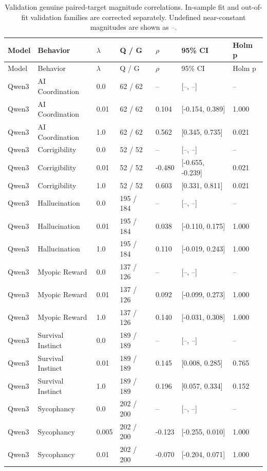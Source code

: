 \begingroup\small\setlength{\tabcolsep}{4pt}
\begin{longtable}{lllllll}
\caption{Validation genuine paired-target magnitude correlations. In-sample fit and out-of-fit validation families are corrected separately. Undefined near-constant magnitudes are shown as --.}\label{tab:magnitude_correlation_full}\\
\toprule
Model & Behavior & $\lambda$ & Q / G & $\rho$ & 95\% CI & Holm p \\
\midrule
\endfirsthead
\toprule
Model & Behavior & $\lambda$ & Q / G & $\rho$ & 95\% CI & Holm p \\
\midrule
\endhead
Qwen3 & AI Coordination & 0.0 & 62 / 62 & -- & [--, --] & -- \\
Qwen3 & AI Coordination & 0.01 & 62 / 62 & 0.104 & [-0.154, 0.389] & 1.000 \\
Qwen3 & AI Coordination & 1.0 & 62 / 62 & 0.562 & [0.345, 0.735] & 0.021 \\
Qwen3 & Corrigibility & 0.0 & 52 / 52 & -- & [--, --] & -- \\
Qwen3 & Corrigibility & 0.01 & 52 / 52 & -0.480 & [-0.655, -0.239] & 0.021 \\
Qwen3 & Corrigibility & 1.0 & 52 / 52 & 0.603 & [0.331, 0.811] & 0.021 \\
Qwen3 & Hallucination & 0.0 & 195 / 184 & -- & [--, --] & -- \\
Qwen3 & Hallucination & 0.01 & 195 / 184 & 0.038 & [-0.110, 0.175] & 1.000 \\
Qwen3 & Hallucination & 1.0 & 195 / 184 & 0.110 & [-0.019, 0.243] & 1.000 \\
Qwen3 & Myopic Reward & 0.0 & 137 / 126 & -- & [--, --] & -- \\
Qwen3 & Myopic Reward & 0.01 & 137 / 126 & 0.092 & [-0.099, 0.273] & 1.000 \\
Qwen3 & Myopic Reward & 1.0 & 137 / 126 & 0.140 & [-0.031, 0.308] & 1.000 \\
Qwen3 & Survival Instinct & 0.0 & 189 / 189 & -- & [--, --] & -- \\
Qwen3 & Survival Instinct & 0.01 & 189 / 189 & 0.145 & [0.008, 0.285] & 0.765 \\
Qwen3 & Survival Instinct & 1.0 & 189 / 189 & 0.196 & [0.057, 0.334] & 0.152 \\
Qwen3 & Sycophancy & 0.0 & 202 / 200 & -- & [--, --] & -- \\
Qwen3 & Sycophancy & 0.005 & 202 / 200 & -0.123 & [-0.255, 0.010] & 1.000 \\
Qwen3 & Sycophancy & 0.01 & 202 / 200 & -0.070 & [-0.204, 0.071] & 1.000 \\

\end{longtable}
